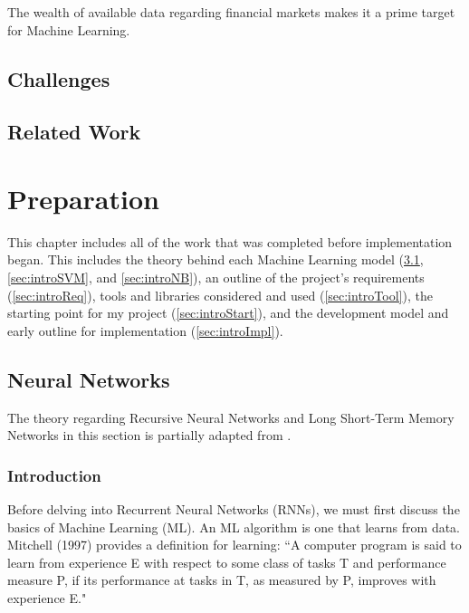 \documentclass[12pt,a4paper,twoside,openright]{report}
\begin{document}
The wealth of available data regarding financial markets makes it a prime target for Machine Learning.



\section{Challenges}



\section{Related Work}



\chapter{Preparation}
\label{sec:prep}

This chapter includes all of the work that was completed before implementation began.
This includes the theory behind each Machine Learning model (\cref{sec:introNN},
\cref{sec:introSVM}, and \cref{sec:introNB}), 
an outline of the project's requirements (\cref{sec:introReq}), tools and libraries
considered and used (\cref{sec:introTool}), the starting point
for my project (\cref{sec:introStart}), and the development model and
early outline for implementation (\cref{sec:introImpl}).

\section{Neural Networks}
\label{sec:introNN}

The theory regarding Recursive Neural Networks and
Long Short-Term Memory Networks in this section is partially adapted from \cite{Goodfellow-et-al-2016,
Hochreiter97, Gers99, Graves13}.

\subsection{Introduction}

Before delving into Recurrent Neural Networks (RNNs), we must first discuss
the basics of Machine Learning (ML). An ML algorithm is one that learns from
data. Mitchell (1997) provides a definition for learning:
``A computer program is said to learn from experience E with respect to some
class of tasks T and performance measure P, if its performance at tasks in T, as
measured by P, improves with experience E."\cite{Mitchell97} 
\end{document}
